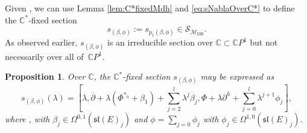 \documentclass[pdftex]{sigma}
\numberwithin{equation}{section}
\newtheorem{Proposition}[Theorem]{Proposition}
\theoremstyle{definition}
\newcommand\C{{\mathbb C}}
\begin{document}
Given , we can use Lemma \ref{lem:C*fixedMdh} and \eqref{eq:sNablaOverC*} to define the $\C^*$-fixed section
\[
s_{(\beta, \phi)} := s_{p_1(\beta, \phi)} \in \mathcal S_{\mathcal{M}_{\mathrm{DH}}}.
\]
As observed earlier, $s_{(\beta, \phi)}$ is an irreducible section over $\C \subset \C P^1$
but not necessarily over all of~$\C P^1$.

\begin{Proposition}\label{Prop:C*_sectionLiftC}
Over $\C$, the $\C^*$-fixed section $s_{(\beta, \phi)}$ may be expressed as
\begin{equation}\label{eq:C*_sectionLiftC}
s_{(\beta,\phi)}(\lambda) = \left[\lambda, {\overline{\partial}} + \lambda(\Phi^{*_h}+\beta_1) + \sum_{j=2}^l\lambda^j\beta_j, \Phi + \lambda\partial^h + \sum_{j=0}^l\lambda^{j+1}\phi_j\right],
\end{equation}
where , with $\beta_j \in \Omega^{0,1}(\mathfrak{sl}(E)_j)$ and
$\phi = \sum_{j=0}\phi_j$ with $\phi_j \in \Omega^{1,0}(\mathfrak{sl}(E)_j)$.
\end{Proposition}
\end{document}
